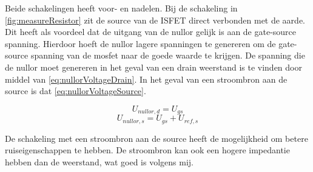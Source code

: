 Beide schakelingen heeft voor- en nadelen.
Bij de schakeling in \autoref{fig:measureResistor} zit de source van de ISFET direct verbonden met de aarde. Dit heeft als voordeel dat de uitgang van de nullor gelijk is aan de gate-source spanning. Hierdoor hoeft de nullor lagere spanningen te genereren om de gate-source spanning van de mosfet naar de goede waarde te krijgen. De spanning die de nullor moet genereren in het geval van een drain weerstand is te vinden door middel van \autoref{eq:nullorVoltageDrain}. In het geval van een stroombron aan de source is dat \autoref{eq:nullorVoltageSource}.

\begin{equation}\label{eq:nullorVoltageDrain}
    U_{nullor,d} = U_{gs}
\end{equation}
\begin{equation}\label{eq:nullorVoltageSource}
    U_{nullor,s} = U_{gs} + U_{ref,s}
\end{equation}

De schakeling met een stroombron aan de source heeft de mogelijkheid om betere ruiseigenschappen te hebben. De stroombron kan ook een hogere impedantie hebben dan de weerstand, wat goed is volgens mij. 

